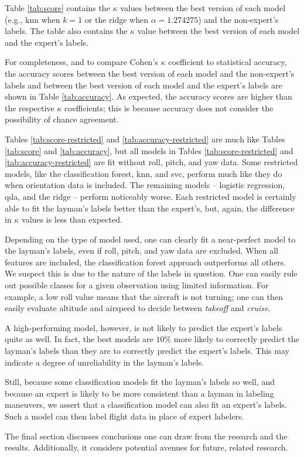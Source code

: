 \documentclass[../main.tex]{subfiles}
\begin{document}
Table \ref{tab:score} contains the $\kappa$ values between the best version of each model (e.g., \ac{knn} when $k=1$ or the ridge when $\alpha=1.274275$) and the non-expert's labels. The table also contains the $\kappa$ value between the best version of each model and the expert's labels.

For completeness, and to compare Cohen's $\kappa$ coefficient to statistical accuracy, the accuracy scores between the best version of each model and the non-expert's labels and between the best version of each model and the expert's labels are shown in Table \ref{tab:accuracy}. As expected, the accuracy scores are higher than the respective $\kappa$ coefficients; this is because accuracy does not consider the possibility of chance agreement.

Tables \ref{tab:score-restricted} and \ref{tab:accuracy-restricted} are much like Tables \ref{tab:score} and \ref{tab:accuracy}, but all models in Tables \ref{tab:score-restricted} and \ref{tab:accuracy-restricted} are fit without roll, pitch, and yaw data. Some restricted models, like the classification forest, \ac{knn}, and \ac{svc}, perform much like they do when orientation data is included. The remaining models -- logistic regression, \ac{qda}, and the ridge -- perform noticeably worse. Each restricted model is certainly able to fit the layman's labels better than the expert's, but, again, the difference in $\kappa$ values is less than expected.


Depending on the type of model used, one can clearly fit a near-perfect model to the layman's labels, even if roll, pitch, and yaw data are excluded. When all features are included, the classification forest approach outperforms all others. We suspect this is due to the nature of the labels in question. One can easily rule out possible classes for a given observation using limited information. For example, a low roll value means that the aircraft is not turning; one can then easily evaluate altitude and airspeed to decide between \textit{takeoff} and \textit{cruise}.

A high-performing model, however, is not likely to predict the expert's labels quite as well. In fact, the best models are $10\%$ more likely to correctly predict the layman's labels than they are to correctly predict the expert's labels. This may indicate a degree of unreliability in the layman's labels.

Still, because some classification models fit the layman's labels so well, and because an expert is likely to be more consistent than a layman in labeling maneuvers, we assert that a classification model can also fit an expert's labels. Such a model can then label flight data in place of expert labelers.


The final section discusses conclusions one can draw from the research and the results. Additionally, it considers potential avenues for future, related research.
\end{document}
